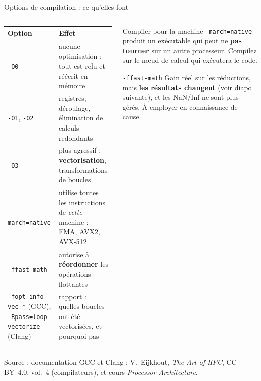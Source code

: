 \documentclass[8pt,aspectratio=169]{beamer}
\newcommand{\src}[1]{\vfill{\tiny\color{gray}Source : #1\par}}
\newcommand{\eij}{V.~Eijkhout, \emph{The Art of HPC}, CC-BY~4.0}
\begin{document}
\begin{frame}{Options de compilation : ce qu'elles font}
\begin{columns}[T]
\begin{column}{0.58\textwidth}
\begin{tabular}{@{}L{2.2cm}L{5.2cm}@{}}
\toprule
\textbf{Option} & \textbf{Effet}\\
\midrule
\texttt{-O0} & aucune optimisation : tout est relu et réécrit en mémoire\\
\texttt{-O1}, \texttt{-O2} & registres, déroulage, élimination de calculs redondants\\
\texttt{-O3} & plus agressif : \textbf{vectorisation}, transformations de boucles\\
\texttt{-march=native} & utilise toutes les instructions de \emph{cette} machine : FMA, AVX2, AVX-512\\
\texttt{-ffast-math} & autorise à \textbf{réordonner} les opérations flottantes\\
\texttt{-fopt-info-vec-*} (GCC), \texttt{-Rpass=loop-vectorize} (Clang) & rapport : quelles boucles ont été vectorisées, et pourquoi pas\\
\bottomrule
\end{tabular}
\end{column}
\begin{column}{0.4\textwidth}
\begin{block}{Compiler pour la machine}
\texttt{-march=native} produit un exécutable qui peut ne \textbf{pas tourner} sur un autre processeur. Compilez sur le nœud de calcul qui exécutera le code.
\end{block}
\begin{alertblock}{\texttt{-ffast-math}}
Gain réel sur les réductions, mais \textbf{les résultats changent} (voir diapo suivante), et les NaN/Inf ne sont plus gérés. À employer en connaissance de cause.
\end{alertblock}
\end{column}
\end{columns}
\src{documentation GCC et Clang ; \eij{}, vol.~4 (compilateurs), et cours \emph{Processor Architecture}.}
\end{frame}
\end{document}
